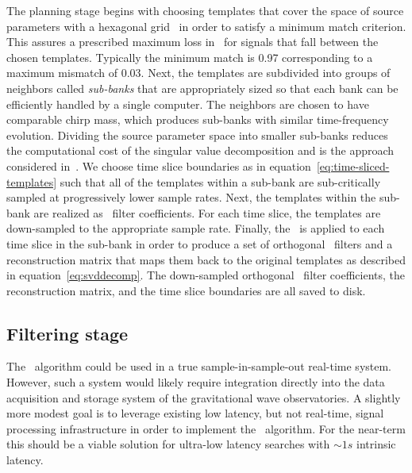 The planning stage begins with choosing templates that cover the space of source
parameters with a hexagonal grid~\cite{PhysRevD.76.102004} in order to satisfy
a minimum match criterion.  This assures a prescribed maximum loss in \SNR\
for signals that fall between the chosen templates.  Typically the minimum
match is 0.97 corresponding to a maximum mismatch of 0.03.  Next, the templates
are subdivided into groups of neighbors called \emph{sub-banks} that are
appropriately sized so that each bank can be efficiently handled by a single
computer.  The neighbors are chosen to have comparable chirp mass, which produces
sub-banks with similar time-frequency evolution.  Dividing the source parameter space
into smaller sub-banks reduces the computational cost of the singular value decomposition
and is the approach considered in~\cite{Cannon:2010p10398}.  We choose time
slice boundaries as in equation~\eqref{eq:time-sliced-templates} such that all of the templates within a
sub-bank are sub-critically sampled at progressively lower sample rates.  Next,
the templates within the sub-bank are realized as \fir\ filter
coefficients.  For each time slice, the templates are down-sampled to the
appropriate sample rate.  Finally, the \SVD\ is applied to each time
slice in the sub-bank in order to produce a set of orthogonal \fir\
filters and a reconstruction matrix that maps them back to the original
templates as described in equation~\eqref{eq:svddecomp}.  The down-sampled orthogonal
\fir\ filter coefficients, the reconstruction matrix, and the time slice
boundaries are all saved to disk.

\subsection{Filtering stage}

The \lloid\ algorithm could be used in a true sample-in-sample-out real-time
system.  However, such a system would likely require integration directly into
the data acquisition and storage system of the gravitational wave
observatories.  A slightly more modest goal is to leverage existing low
latency, but not real-time, signal processing infrastructure in order to
implement the \lloid\ algorithm.  For the near-term this should be a viable 
solution for ultra-low latency searches with $\sim 1s$ intrinsic latency.

